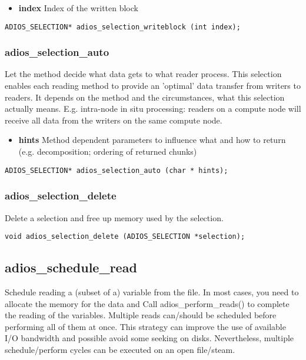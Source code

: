 \begin{itemize} 
\item{\bf index}    Index of the written block
\end{itemize}

\begin{lstlisting}[alsolanguage=C]
ADIOS_SELECTION* adios_selection_writeblock (int index);
\end{lstlisting}


\subsubsection{adios\_selection\_auto}
Let the method decide what data gets to what reader process.
This selection enables each reading method to provide an 'optimal'
data transfer from writers to readers. It depends on the method and the 
circumstances, what this selection actually means.
E.g. intra-node in situ processing: readers on a compute node will receive all data 
from the writers on the same compute node.

\begin{itemize} 
\item{\bf hints}    Method dependent parameters to influence what and how to 
 return (e.g. decomposition; ordering of returned chunks)
\end{itemize} 

\begin{lstlisting}[alsolanguage=C]
ADIOS_SELECTION* adios_selection_auto (char * hints);
\end{lstlisting}


\subsubsection{adios\_selection\_delete}
Delete a selection and free up memory used by the selection.

\begin{lstlisting}[alsolanguage=C]
void adios_selection_delete (ADIOS_SELECTION *selection);
\end{lstlisting}




\subsection{adios\_schedule\_read}
Schedule reading a (subset of a) variable from the file.
In most cases, you need to allocate the memory for the data and 
Call adios\_perform\_reads() to 
complete the reading of the variables. Multiple reads can/should be scheduled before performing 
all of them at once. This strategy can improve the use of available I/O bandwidth and possible avoid
some seeking on disks. Nevertheless, multiple schedule/perform cycles can be executed on an 
open file/steam.

